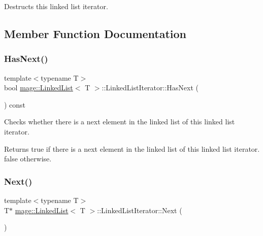 Destructs this linked list iterator. 

\subsection{Member Function Documentation}
\hypertarget{structmage_1_1_linked_list_1_1_linked_list_iterator_ae23127f7be560d81bbda5321690a7ef9}{}\label{structmage_1_1_linked_list_1_1_linked_list_iterator_ae23127f7be560d81bbda5321690a7ef9} 
\subsubsection{\texorpdfstring{Has\+Next()}{HasNext()}}
{\footnotesize\ttfamily template$<$typename T$>$ \\
bool \hyperlink{classmage_1_1_linked_list}{mage\+::\+Linked\+List}$<$ T $>$\+::Linked\+List\+Iterator\+::\+Has\+Next (\begin{DoxyParamCaption}{ }\end{DoxyParamCaption}) const}

Checks whether there is a next element in the linked list of this linked list iterator.

\begin{DoxyReturn}{Returns}
{\ttfamily true} if there is a next element in the linked list of this linked list iterator. {\ttfamily false} otherwise. 
\end{DoxyReturn}
\hypertarget{structmage_1_1_linked_list_1_1_linked_list_iterator_aaffb4ff395841103f65d09b2784ad61f}{}\label{structmage_1_1_linked_list_1_1_linked_list_iterator_aaffb4ff395841103f65d09b2784ad61f} 
\subsubsection{\texorpdfstring{Next()}{Next()}}
{\footnotesize\ttfamily template$<$typename T$>$ \\
T$\ast$ \hyperlink{classmage_1_1_linked_list}{mage\+::\+Linked\+List}$<$ T $>$\+::Linked\+List\+Iterator\+::\+Next (\begin{DoxyParamCaption}{ }\end{DoxyParamCaption})}

